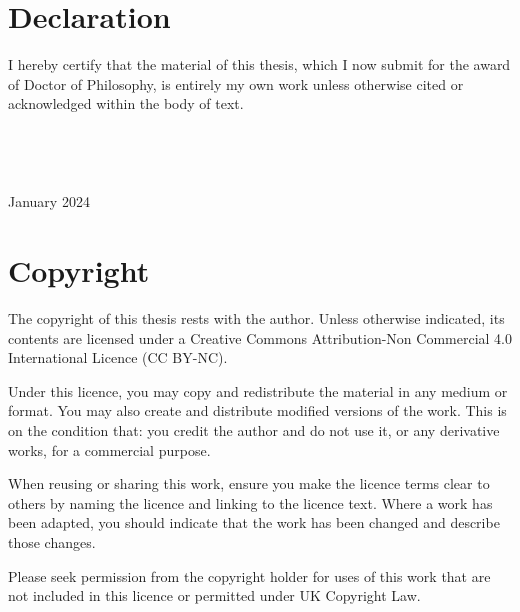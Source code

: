 \chapter*{Declaration}

I hereby certify that the material of this thesis, which I now submit for the award of Doctor of Philosophy, is entirely my own work unless otherwise cited or acknowledged within the body of text.
\\
\\
\\
\\
 \\
January 2024

\begingroup
\let\clearpage\relax
\chapter*{Copyright}
The copyright of this thesis rests with the author. Unless otherwise indicated, its contents are licensed under a Creative Commons Attribution-Non Commercial 4.0 International Licence (CC BY-NC). 

Under this licence, you may copy and redistribute the material in any medium or format. You may also create and distribute modified versions of the work. This is on the condition that: you credit the author and do not use it, or any derivative works, for a commercial purpose.

When reusing or sharing this work, ensure you make the licence terms clear to others by naming the licence and linking to the licence text. Where a work has been adapted, you should indicate that the work has been changed and describe those changes. 

Please seek permission from the copyright holder for uses of this work that are not included in this licence or permitted under UK Copyright Law.

\endgroup